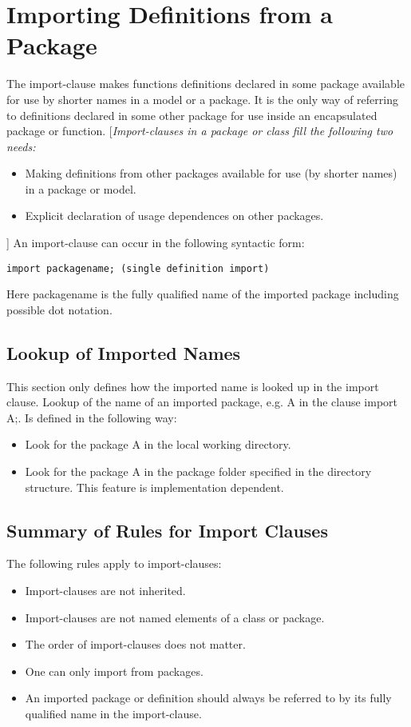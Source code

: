 \documentclass[11pt,a4paper,notitlepage]{report}
\begin{document}
\section{Importing Definitions from a Package}

The import-clause makes functions definitions declared in some package available for use by shorter names in a model or a package. It is the only way of referring to definitions declared in some other package for use inside an encapsulated package or function.
[\emph{Import-clauses in a package or class fill the following two needs:}
\begin{itemize}
\item Making definitions from other packages available for use (by shorter names) in a package or model.
\item Explicit declaration of usage dependences on other packages.
\end{itemize}
]
An import-clause can occur in the following syntactic form:

\verb"import packagename; (single definition import)" 

Here packagename is the fully qualified name of the imported package including possible dot notation.
 
\subsection{Lookup of Imported Names}

This section only defines how the imported name is looked up in the import clause.
Lookup of the name of an imported package, e.g. A in the clause import A;. Is defined in the following way:
\begin{itemize}
\item Look for the package A in the local working directory.
\item Look for the package A in the package folder specified in the directory structure. This feature is implementation dependent.
\end{itemize} 

\subsection{Summary of Rules for Import Clauses}
The following rules apply to import-clauses:
\begin{itemize}
\item Import-clauses are not inherited.
\item Import-clauses are not named elements of a class or package. 
\item The order of import-clauses does not matter.
\item One can only import from packages. 
\item An imported package or definition should always be referred to by its fully qualified name in the import-clause.
\end{itemize}
\end{document}
